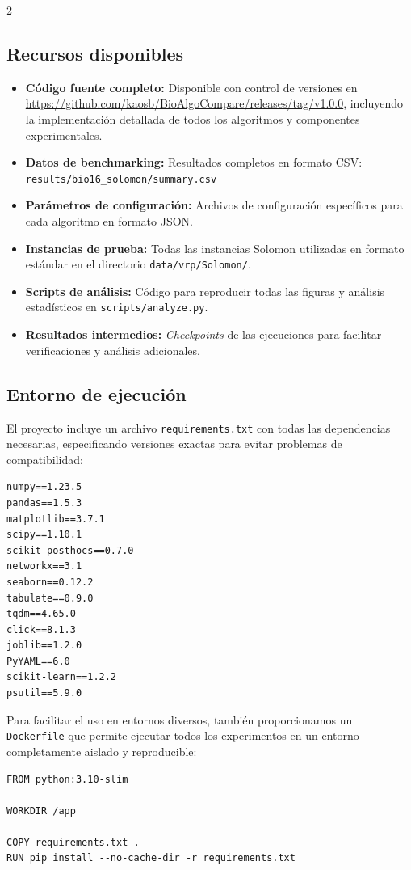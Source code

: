 \documentclass[10pt,a4paper]{extarticle}
\begin{document}
{\begin{multicols}{2}
\subsection{Recursos disponibles}
\begin{itemize}
\item \textbf{Código fuente completo:} Disponible con control de versiones en \url{https://github.com/kaosb/BioAlgoCompare/releases/tag/v1.0.0}, incluyendo la implementación detallada de todos los algoritmos y componentes experimentales.
\item \textbf{Datos de benchmarking:} Resultados completos en formato CSV: \texttt{results/bio16_solomon/summary.csv}
\item \textbf{Parámetros de configuración:} Archivos de configuración específicos para cada algoritmo en formato JSON.
\item \textbf{Instancias de prueba:} Todas las instancias Solomon utilizadas en formato estándar en el directorio \texttt{data/vrp/Solomon/}.
\item \textbf{Scripts de análisis:} Código para reproducir todas las figuras y análisis estadísticos en \texttt{scripts/analyze.py}.
\item \textbf{Resultados intermedios:} \textit{Checkpoints} de las ejecuciones para facilitar verificaciones y análisis adicionales.
\end{itemize}

\subsection{Entorno de ejecución}
El proyecto incluye un archivo \texttt{requirements.txt} con todas las dependencias necesarias, especificando versiones exactas para evitar problemas de compatibilidad:
\begin{lstlisting}
numpy==1.23.5
pandas==1.5.3
matplotlib==3.7.1
scipy==1.10.1
scikit-posthocs==0.7.0
networkx==3.1
seaborn==0.12.2
tabulate==0.9.0
tqdm==4.65.0
click==8.1.3
joblib==1.2.0
PyYAML==6.0
scikit-learn==1.2.2
psutil==5.9.0
\end{lstlisting}

Para facilitar el uso en entornos diversos, también proporcionamos un \texttt{Dockerfile} que permite ejecutar todos los experimentos en un entorno completamente aislado y reproducible:
\begin{lstlisting}
FROM python:3.10-slim

WORKDIR /app

COPY requirements.txt .
RUN pip install --no-cache-dir -r requirements.txt


\end{lstlisting}
\end{multicols}}
\end{document}
